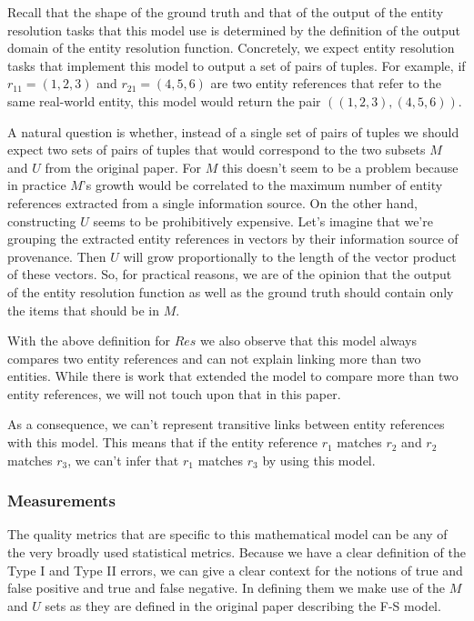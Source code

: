 \documentclass[11pt]{article}
\begin{document}
    Recall that the shape of the ground truth and that of the output of the
    entity resolution tasks that this model use is determined by the definition
    of the output domain of the entity resolution function.
    Concretely, we expect entity resolution tasks that implement this model to
    output a set of pairs of tuples.
    For example, if $r_{11}=(1, 2, 3)$ and $r_{21}=(4, 5, 6)$ are two entity
    references that refer to the same real-world entity, this model would return
    the pair $((1, 2, 3), (4, 5, 6))$.

    A natural question is whether, instead of a single set of pairs of tuples we
    should expect two sets of pairs of tuples that would correspond to the two
    subsets $M$ and $U$ from the original paper.
    For $M$ this doesn't seem to be a problem because in practice $M$'s growth
    would be correlated to the maximum number of entity references extracted
    from a single information source.
    On the other hand, constructing $U$ seems to be prohibitively expensive.
    Let's imagine that we're grouping the extracted entity references in vectors
    by their information source of provenance.
    Then $U$ will grow proportionally to the length of the vector product of
    these vectors.
    So, for practical reasons, we are of the opinion that the output of the
    entity resolution function as well as the ground truth should contain only
    the items that should be in $M$.

    With the above definition for $Res$ we also observe that this model always
    compares two entity references and can not explain linking more than two
    entities\cite{Tal11}.
    While there is work that extended the model to compare more than two 
    entity references\cite{Kon19}, we will not touch upon that in this paper.
    
    As a consequence, we can't represent transitive links between entity
    references with this model.
    This means that if the entity reference $r_1$ matches $r_2$ and
    $r_2$ matches $r_3$, we can't infer that $r_1$ matches $r_3$ by using this
    model\cite{Tal11}.

    \subsubsection[fms-measure]{Measurements}\label{fsm-measure}

    The quality metrics that are specific to this mathematical model can be any
    of the very broadly used statistical metrics.
    Because we have a clear definition of the Type I and Type II errors, we can
    give a clear context for the notions of true and false positive and true and
    false negative.
    In defining them we make use of the $M$ and $U$ sets as they are defined in
    the original paper describing the F-S model.
\end{document}
